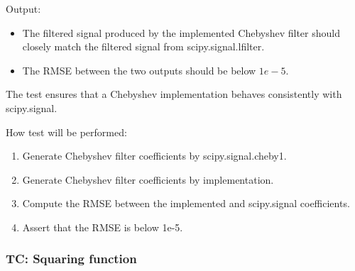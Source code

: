 \documentclass[12pt, titlepage]{article}
\begin{document}
\begin{enumerate}
  Output:
  \begin{itemize}
    \item The filtered signal produced by the implemented Chebyshev filter
    should closely match the filtered signal from scipy.signal.lfilter.
    \item The RMSE between the two outputs should be below $1e-5$.
  \end{itemize}
  
  The test ensures that a Chebyshev implementation behaves consistently with
  scipy.signal.
  
  How test will be performed: 
  \begin{enumerate}
    \item Generate Chebyshev filter coefficients by scipy.signal.cheby1.
    \item Generate Chebyshev filter coefficients by implementation.
    \item Compute the RMSE between the implemented and scipy.signal
    coefficients.
    \item Assert that the RMSE is below 1e-5.
  \end{enumerate}
  
\end{enumerate}

 \label{TC_SQUARING}
\subsubsection{TC\thetestcasenum : Squaring function}
\end{document}
